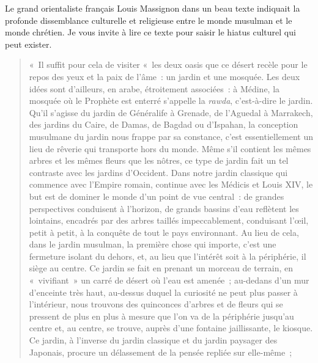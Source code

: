 Le grand orientaliste français Louis Massignon dans un beau texte
indiquait la profonde dissemblance culturelle et religieuse entre le
monde musulman et le monde chrétien. Je vous
invite à lire ce texte pour saisir le hiatus culturel qui peut exister.
\begin{quote}
 «~Il suffit pour cela de visiter «~les deux oasis que ce désert recèle
pour le repos des yeux et la paix de l'âme~: un jardin et une mosquée.
Les deux idées sont d'ailleurs, en arabe, étroitement associées~: à
Médine, la mosquée où le Prophète est enterré s'appelle la \emph{rawda},
c'est-à-dire le jardin. Qu'il s'agisse du jardin de Généralife à
Grenade, de l'Aguedal à Marrakech, des jardins du Caire, de Damas, de
Bagdad ou d'Ispahan, la conception musulmane du jardin nous frappe par
sa constance, c'est essentiellement un lieu de rêverie qui transporte
hors du monde. Même s'il contient les mêmes arbres et les mêmes fleurs
que les nôtres, ce type de jardin fait un tel contraste avec les jardins
d'Occident. Dans notre jardin classique qui commence avec l'Empire
romain, continue avec les Médicis et Louis XIV, le but est de dominer le
monde d'un point de vue central~: de grandes perspectives conduisent à
l'horizon, de grands bassins d'eau reflètent les lointains, encadrés par
des arbres taillés impeccablement, conduisant l'œil, petit à petit, à la
conquête de tout le pays environnant. Au lieu de cela, dans le jardin
musulman, la première chose qui importe, c'est une fermeture isolant du
dehors, et, au lieu que l'intérêt soit à la périphérie, il siège au
centre. Ce jardin se fait en prenant un morceau de terrain, en
«~vivifiant~» un carré de désert où l'eau est amenée~; au-dedans d'un
mur d'enceinte très haut, au-dessus duquel la curiosité ne peut plus
passer à l'intérieur, nous trouvons des quinconces d'arbres et de fleurs
qui se pressent de plus en plus à mesure que l'on va de la périphérie
jusqu'au centre et, au centre, se trouve, auprès d'une fontaine
jaillissante, le kiosque. Ce jardin, à l'inverse du jardin classique et
du jardin paysager des Japonais, procure un délassement de la pensée
repliée sur elle-même~;   
\end{quote}


